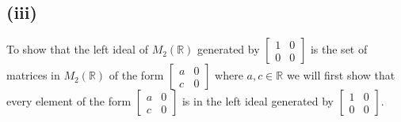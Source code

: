 \documentclass{article}
\begin{document}
    \subsection*{(iii)}
      To show that the left ideal of $M_2(\mathbb{R})$ generated by $\begin{bmatrix}1 & 0 \\ 0 & 0 \end{bmatrix}$ is the set of matrices in $M_2(\mathbb{R})$ of the form $\begin{bmatrix}a & 0 \\ c & 0 \end{bmatrix}$ where $a,c \in \mathbb{R}$ we will first show that every element of the form $\begin{bmatrix}a & 0 \\ c & 0 \end{bmatrix}$ is in the left ideal generated by $\begin{bmatrix}1 & 0 \\ 0 & 0 \end{bmatrix}$.
        
      \noindent
\end{document}
